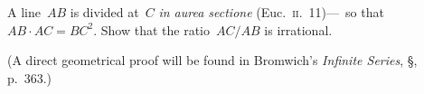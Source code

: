  A line~$AB$ is divided at~$C$ \textit{in aurea sectione} (Euc.~\textsc{ii}.~11)---\ie\ so that
$AB·AC = BC^{2}$. Show that the ratio~$AC/AB$ is irrational.

(A direct geometrical proof will be found in Bromwich's \textit{Infinite Series},
§, p.~363.)

